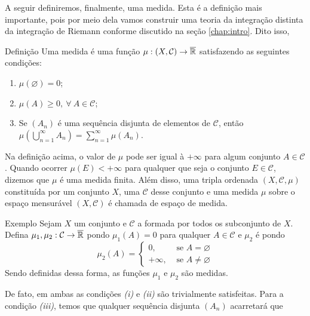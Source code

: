 A seguir definiremos, finalmente, uma medida.
Esta é a definição mais importante, pois por meio dela vamos construir uma teoria da integração distinta da integração de Riemann conforme discutido na seção \ref{chap:intro}.
Dito isso, 
\begin{env}{Definição}
\label{def:medida}
    Uma medida é uma função $\mu: (X, \mathcal{C}) \to \operatorname{\overline{\mathbb{R}}}$ satisfazendo as seguintes condições:
    \begin{enumerate}[label* = (\roman*)]
        \item $\mu(\varnothing) = 0$;
        \item $\mu(A) \geq 0, \ \forall \ A \in \mathcal{C}$;
        \item Se $(A_n)$ é uma sequência disjunta de elementos de  $\mathcal{C}$, então 
        $\displaystyle\mu\left(\bigcup_{n = 1}^\infty A_n\right) = \sum_{n = 1}^\infty\mu(A_n)$.
    \end{enumerate}
\end{env}

Na definição acima, o valor de $\mu$ pode ser igual à $+\infty$ para algum conjunto $A \in \mathcal{C}$.
Quando ocorrer $\mu(E) < +\infty$ para qualquer que seja o conjunto $E \in \mathcal{C}$, dizemos que $\mu$ é uma medida finita. 
Além disso, uma tripla ordenada $(X, \mathcal{C}, \mu)$ constituída por um conjunto $X$, uma \sigal $\mathcal{C}$ desse conjunto e uma medida $\mu$ sobre o espaço mensurável $(X, \mathcal{C})$ é chamada de espaço de medida.


\begin{env}{Exemplo}
    Sejam $X$ um conjunto e $\mathcal{C}$ a \sigal formada por todos os subconjunto de $X$.    
    Defina $\mu_1, \mu_2:\mathcal{C} \to \operatorname{\overline{\mathbb{R}}}$ pondo $\mu_1(A) = 0$ para qualquer  $A \in \mathcal{C}$ e 
    $\mu_2$ é  pondo 
	$$\mu_2(A) = \left\{\begin{array}{cc}
	0, & \textrm{\ se \ } A = \varnothing \\
	+\infty,& \textrm{\ se \ } A \neq \varnothing
	\end{array}\right.$$
	Sendo definidas dessa forma, as funções $\mu_1$ e $\mu_2$ são medidas.
	\end{env}

De fato, em ambas as condições \textit{(i)} e \textit{(ii)} são trivialmente satisfeitas.
Para a condição \textit{(iii)}, temos que qualquer sequência disjunta $(A_n)$ acarretará que


